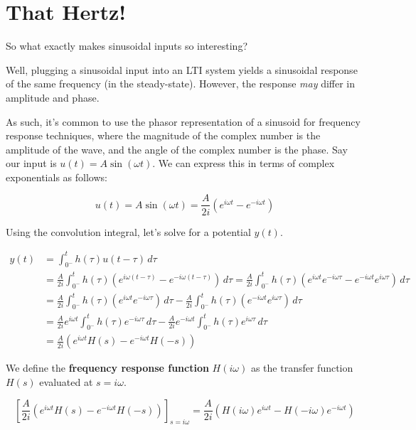 \documentclass[
  letterpaper,
  DIV=11,
  numbers=noendperiod]{scrreprt}
\begin{document}
\hypertarget{that-hertz}{%
\section{That Hertz!}\label{that-hertz}}

So what exactly makes sinusoidal inputs so interesting?

Well, plugging a sinusoidal input into an LTI system yields a sinusoidal
response of the same frequency (in the steady-state). However, the
response \emph{may} differ in amplitude and phase.

As such, it's common to use the phasor representation of a sinusoid for
frequency response techniques, where the magnitude of the complex number
is the amplitude of the wave, and the angle of the complex number is the
phase. Say our input is \(u(t) = A \sin(\omega t)\). We can express this
in terms of complex exponentials as follows:

\[u(t) = A \sin(\omega t) = \frac{A}{2i} \left(e^{i\omega t} - e^{-i \omega t} \right)\]

Using the convolution integral, let's solve for a potential \(y(t)\).

\begin{align*}
y(t) &= \int_{0^-}^t h(\tau) u(t-\tau) \, d\tau \\
&= \frac{A}{2i} \int_{0^-}^t h(\tau) \left(e^{i\omega (t - \tau)} - e^{-i \omega (t - \tau)} \right) \, d\tau = \frac{A}{2i} \int_{0^-}^t h(\tau) \left(e^{i\omega t} e^{-i\omega \tau} - e^{-i\omega t} e^{i\omega \tau} \right) \, d\tau \\
&= \frac{A}{2i} \int_{0^-}^t h(\tau) \left(e^{i\omega t} e^{-i\omega \tau} \right) \, d\tau - \frac{A}{2i} \int_{0^-}^t h(\tau) \left(e^{-i\omega t} e^{i\omega \tau} \right) \, d\tau \\
&= \frac{A}{2i} e^{i\omega t} \int_{0^-}^t h(\tau)  e^{-i\omega \tau} \, d\tau - \frac{A}{2i} e^{-i\omega t} \int_{0^-}^t h(\tau) e^{i\omega \tau} \, d\tau\\
&= \frac{A}{2i} \left(e^{i\omega t}H(s) - e^{-i\omega t} H(-s) \right)
\end{align*}

We define the \textbf{frequency response function} \(H(i\omega)\) as the
transfer function \(H(s)\) evaluated at \(s=i\omega\).

\[\left[\frac{A}{2i} \left(e^{i\omega t}H(s) - e^{-i\omega t} H(-s) \right) \right]_{s = i \omega} = \frac{A}{2i} \left( H(i\omega) e^{i\omega t} - H(-i \omega)  e^{-i\omega t} \right)\]
\end{document}
